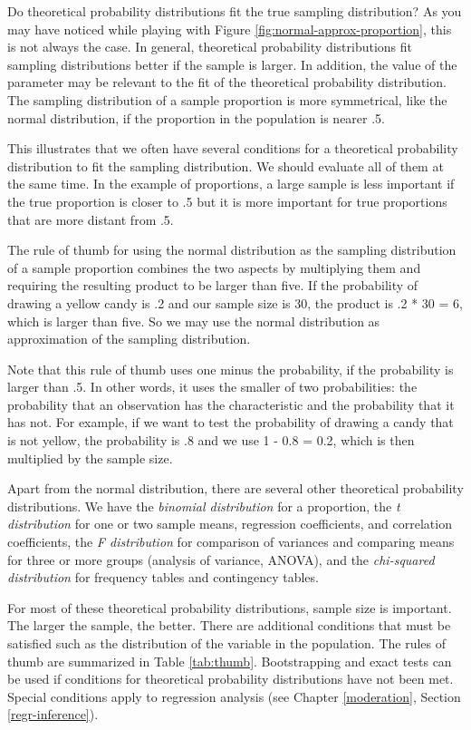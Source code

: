 \documentclass[a4paper]{book}
\theoremstyle{definition}
\theoremstyle{definition}
\theoremstyle{definition}
\theoremstyle{remark}
\begin{document}
Do theoretical probability distributions fit the true sampling
distribution? As you may have noticed while playing with Figure
\ref{fig:normal-approx-proportion}, this is not always the case. In
general, theoretical probability distributions fit sampling
distributions better if the sample is larger. In addition, the value of
the parameter may be relevant to the fit of the theoretical probability
distribution. The sampling distribution of a sample proportion is more
symmetrical, like the normal distribution, if the proportion in the
population is nearer .5.

This illustrates that we often have several conditions for a theoretical
probability distribution to fit the sampling distribution. We should
evaluate all of them at the same time. In the example of proportions, a
large sample is less important if the true proportion is closer to .5
but it is more important for true proportions that are more distant from
.5.

The rule of thumb for using the normal distribution as the sampling
distribution of a sample proportion combines the two aspects by
multiplying them and requiring the resulting product to be larger than
five. If the probability of drawing a yellow candy is .2 and our sample
size is 30, the product is .2 * 30 = 6, which is larger than five. So we
may use the normal distribution as approximation of the sampling
distribution.

Note that this rule of thumb uses one minus the probability, if the
probability is larger than .5. In other words, it uses the smaller of
two probabilities: the probability that an observation has the
characteristic and the probability that it has not. For example, if we
want to test the probability of drawing a candy that is not yellow, the
probability is .8 and we use 1 - 0.8 = 0.2, which is then multiplied by
the sample size.

Apart from the normal distribution, there are several other theoretical
probability distributions. We have the \emph{binomial distribution} for
a proportion, the \emph{t distribution} for one or two sample means,
regression coefficients, and correlation coefficients, the \emph{F
distribution} for comparison of variances and comparing means for three
or more groups (analysis of variance, ANOVA), and the \emph{chi-squared
distribution} for frequency tables and contingency tables.

For most of these theoretical probability distributions, sample size is
important. The larger the sample, the better. There are additional
conditions that must be satisfied such as the distribution of the
variable in the population. The rules of thumb are summarized in Table
\ref{tab:thumb}. Bootstrapping and exact tests can be used if conditions
for theoretical probability distributions have not been met. Special
conditions apply to regression analysis (see Chapter \ref{moderation},
Section \ref{regr-inference}).
\end{document}

